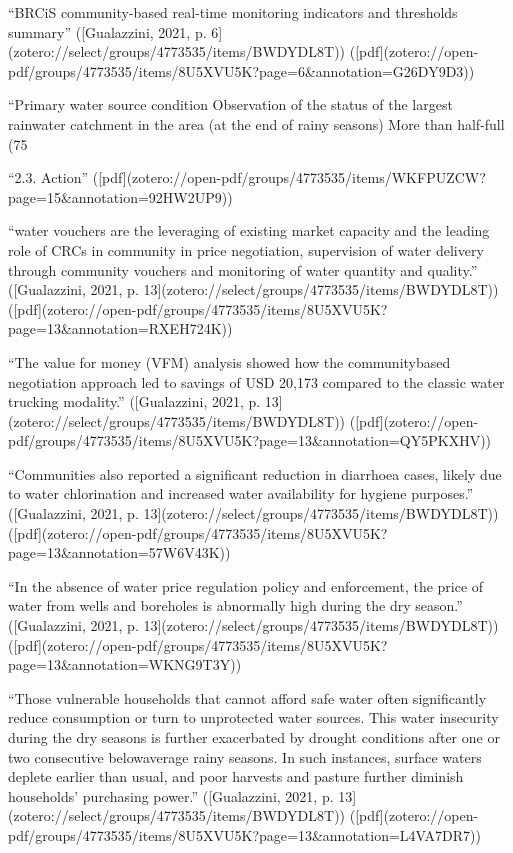 {{%
“BRCiS community-based real-time monitoring indicators and thresholds summary” ([Gualazzini, 2021, p. 6](zotero://select/groups/4773535/items/BWDYDL8T)) ([pdf](zotero://open-pdf/groups/4773535/items/8U5XVU5K?page=6&annotation=G26DY9D3))

“Primary water source condition Observation of the status of the largest rainwater catchment in the area (at the end of rainy seasons) More than half-full (75%


“2.3. Action” ([pdf](zotero://open-pdf/groups/4773535/items/WKFPUZCW?page=15&annotation=92HW2UP9))

“water vouchers are the leveraging of existing market capacity and the leading role of CRCs in community in price negotiation, supervision of water delivery through community vouchers and monitoring of water quantity and quality.” ([Gualazzini, 2021, p. 13](zotero://select/groups/4773535/items/BWDYDL8T)) ([pdf](zotero://open-pdf/groups/4773535/items/8U5XVU5K?page=13&annotation=RXEH724K))

“The value for money (VFM) analysis showed how the communitybased negotiation approach led to savings of USD 20,173 compared to the classic water trucking modality.” ([Gualazzini, 2021, p. 13](zotero://select/groups/4773535/items/BWDYDL8T)) ([pdf](zotero://open-pdf/groups/4773535/items/8U5XVU5K?page=13&annotation=QY5PKXHV))

“Communities also reported a significant reduction in diarrhoea cases, likely due to water chlorination and increased water availability for hygiene purposes.” ([Gualazzini, 2021, p. 13](zotero://select/groups/4773535/items/BWDYDL8T)) ([pdf](zotero://open-pdf/groups/4773535/items/8U5XVU5K?page=13&annotation=57W6V43K))

“In the absence of water price regulation policy and enforcement, the price of water from wells and boreholes is abnormally high during the dry season.” ([Gualazzini, 2021, p. 13](zotero://select/groups/4773535/items/BWDYDL8T)) ([pdf](zotero://open-pdf/groups/4773535/items/8U5XVU5K?page=13&annotation=WKNG9T3Y))

“Those vulnerable households that cannot afford safe water often significantly reduce consumption or turn to unprotected water sources. This water insecurity during the dry seasons is further exacerbated by drought conditions after one or two consecutive belowaverage rainy seasons. In such instances, surface waters deplete earlier than usual, and poor harvests and pasture further diminish households’ purchasing power.” ([Gualazzini, 2021, p. 13](zotero://select/groups/4773535/items/BWDYDL8T)) ([pdf](zotero://open-pdf/groups/4773535/items/8U5XVU5K?page=13&annotation=L4VA7DR7))

}}
